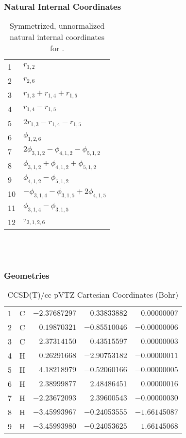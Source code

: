 \documentclass[10pt,oneside]{article}
\begin{document}
\subsubsection*{Natural Internal Coordinates}
\begin{table}[h!]
\centering
\caption{Symmetrized, unnormalized natural internal coordinates for .}
\small
\begin{tabular}{ll}
  1   & $r_{1,2}$ \\
  2   & $r_{2,6}$ \\
  3   & $r_{1,3} + r_{1,4} + r_{1,5}$ \\
  4   & $r_{1,4} - r_{1,5}$ \\
  5   & $2r_{1,3} - r_{1,4} - r_{1,5}$ \\
  6   & $\phi_{1,2,6}$ \\
  7   & $2\phi_{3,1,2} - \phi_{4,1,2} - \phi_{5,1,2}$ \\
  8   & $\phi_{3,1,2} + \phi_{4,1,2} + \phi_{5,1,2}$ \\
  9   & $\phi_{4,1,2} - \phi_{5,1,2}$ \\
  10  & $-\phi_{3,1,4} - \phi_{3,1,5} + 2\phi_{4,1,5}$ \\
  11  & $\phi_{3,1,4} - \phi_{3,1,5}$ \\
  12  & $\tau_{3,1,2,6}$ \\
\end{tabular}
\end{table}

\clearpage

\subsection{\ \ \ }

\subsubsection*{Geometries}
\begin{table}[h!]
\centering
\caption{CCSD(T)/cc-pVTZ Cartesian Coordinates (Bohr)}
\begin{tabular}{llrrr}
1  & C  & $-2.37687297$ & $ 0.33833882$ & $ 0.00000007$ \\
2  & C  & $ 0.19870321$ & $-0.85510046$ & $-0.00000006$ \\
3  & C  & $ 2.37314150$ & $ 0.43515597$ & $ 0.00000003$ \\
4  & H  & $ 0.26291668$ & $-2.90753182$ & $-0.00000011$ \\
5  & H  & $ 4.18218979$ & $-0.52060166$ & $-0.00000005$ \\
6  & H  & $ 2.38999877$ & $ 2.48486451$ & $ 0.00000016$ \\
7  & H  & $-2.23672093$ & $ 2.39600543$ & $-0.00000030$ \\
8  & H  & $-3.45993967$ & $-0.24053555$ & $-1.66145087$ \\
9  & H  & $-3.45993980$ & $-0.24053625$ & $ 1.66145068$ \\
\end{tabular}
\end{table}
\end{document}
